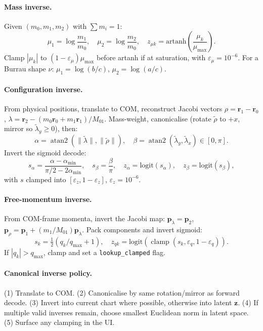 \documentclass[11pt]{report}
\def\boldsymbol#1{#1}%
\DeclareMathOperator{\atanTwo}{atan2}
\DeclareMathOperator{\clamp}{clamp}
\begin{document}
\paragraph{Mass inverse.} Given $(m_0,m_1,m_2)$ with $\sum m_i=1$:
\[
\mu_1=\log\frac{m_1}{m_0},\quad \mu_2=\log\frac{m_2}{m_0},\quad z_{\mu k}=\mathrm{artanh}\!\left(\frac{\mu_k}{\mu_{\max}}\right).
\]
Clamp $|\mu_k|$ to $(1-\varepsilon_\mu)\mu_{\max}$ before artanh if at saturation, with $\varepsilon_\mu=10^{-6}$. For a Burrau shape $\nu$: $\mu_1=\log(b/c)$, $\mu_2=\log(a/c)$.

\paragraph{Configuration inverse.} From physical positions, translate to COM, reconstruct Jacobi vectors $\boldsymbol\rho=\mathbf r_1-\mathbf r_0$, $\boldsymbol\lambda=\mathbf r_2-(m_0\mathbf r_0+m_1\mathbf r_1)/M_{01}$. Mass-weight, canonicalise (rotate $\tilde{\boldsymbol\rho}$ to $+x$, mirror so $\tilde\lambda_y\ge 0$), then:
\[
\alpha=\atanTwo(\|\tilde{\boldsymbol\lambda}\|,\|\tilde{\boldsymbol\rho}\|),\quad \beta=\atanTwo(\tilde\lambda_y,\tilde\lambda_x)\in[0,\pi].
\]
Invert the sigmoid decode:
\[
s_\alpha=\frac{\alpha-\alpha_{\min}}{\pi/2-2\alpha_{\min}},\quad s_\beta=\frac{\beta}{\pi},\quad z_{\alpha}=\mathrm{logit}(s_\alpha),\quad z_{\beta}=\mathrm{logit}(s_\beta),
\]
with $s$ clamped into $[\varepsilon_z,1-\varepsilon_z]$, $\varepsilon_z=10^{-6}$.

\paragraph{Free-momentum inverse.} From COM-frame momenta, invert the Jacobi map: $\mathbf p_\lambda=\mathbf p_2$, $\mathbf p_\rho=\mathbf p_1+(m_1/M_{01})\mathbf p_\lambda$. Pack components and invert sigmoid:
\[
s_k=\tfrac{1}{2}(q_k/q_{\max}+1),\quad z_{qk}=\mathrm{logit}(\clamp(s_k,\varepsilon_q,1-\varepsilon_q)).
\]
If $|q_k|>q_{\max}$, clamp and set a \texttt{lookup\_clamped} flag.

\paragraph{Canonical inverse policy.} (1) Translate to COM. (2) Canonicalise by same rotation/mirror as forward decode. (3) Invert into current chart where possible, otherwise into latent $\mathbf z$. (4) If multiple valid inverses remain, choose smallest Euclidean norm in latent space. (5) Surface any clamping in the UI.
\end{document}
